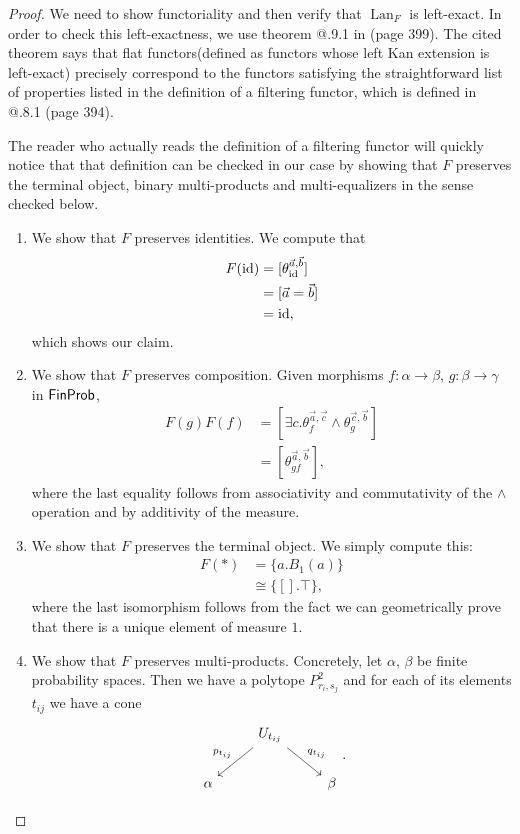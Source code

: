 \documentclass[a4paper]{amsproc}
\makeatletter
\theoremstyle{plain}
\theoremstyle{definition}
\theoremstyle{remark}
\numberwithin{equation}{section}
\newcommand{\id}{\textup{id}}
\DeclareMathOperator{\Lan}{Lan}
\newcommand{\FinProb}{\textup{\textsf{FinProb}}}
\newcommand{\Rmnum}[1]{\expandafter\@slowromancap\romannumeral #1@}
\makeatother
\begin{document}
\begin{proof}
    We need to show functoriality and then verify that $\Lan_F$ is left-exact. In order to check this left-exactness, we use theorem \Rmnum{7}.9.1 in \cite{sheaves_geometry_logic}(page 399). The cited theorem says that flat functors(defined as functors whose left Kan extension is left-exact) precisely correspond to the functors satisfying the straightforward list of properties listed in the definition of a filtering functor, which is defined in \Rmnum{7}.8.1 (page 394).

    The reader who actually reads the definition of a filtering functor will quickly notice that that definition can be checked in our case by showing that $F$ preserves the terminal object, binary multi-products and multi-equalizers in the sense checked below.

    \begin{enumerate}
        \item We show that $F$ preserves identities. We compute that
            \begin{align*}
                F(\id) &= [\theta^{\vec{a},\vec{b}}_{\id}] \\
                &= [\vec{a}=\vec{b}] \\
                &= \id,
            \end{align*}
            which shows our claim.
        \item We show that $F$ preserves composition. Given morphisms $f: \alpha \to \beta$, $g: \beta \to \gamma$ in $\FinProb$,
            \begin{align*}
                F(g)F(f) &= [\exists c . \theta^{\vec{a},\vec{c}}_f \wedge \theta^{\vec{c},\vec{b}}_g] \\
                &= [\theta^{\vec{a},\vec{b}}_{gf}] ,
            \end{align*}
            where the last equality follows from associativity and commutativity of the $\wedge$ operation and by additivity of the measure.
        \item We show that $F$ preserves the terminal object. We simply compute this:
            \begin{align*}
                F(*) &= \{a. B_1(a)\} \\
                &\cong \{[].\top \} ,
            \end{align*}
            where the last isomorphism follows from the fact we can geometrically prove that there is a unique element of measure $1$.
        \item We show that $F$ preserves multi-products. Concretely, let $\alpha$, $\beta$ be finite probability spaces. Then we have a polytope $P^2_{r_i,s_j}$ and for each of its elements $t_{ij}$ we have a cone
        \[\begin{tikzcd}
            & U_{t_{ij}} \arrow[ld, "p_{t_{ij}}"'] \arrow[rd, "q_{t_{ij}}"] &       \\
        \alpha &                                                               & \beta
        \end{tikzcd} .\]


\end{enumerate}
\end{proof}
\end{document}
